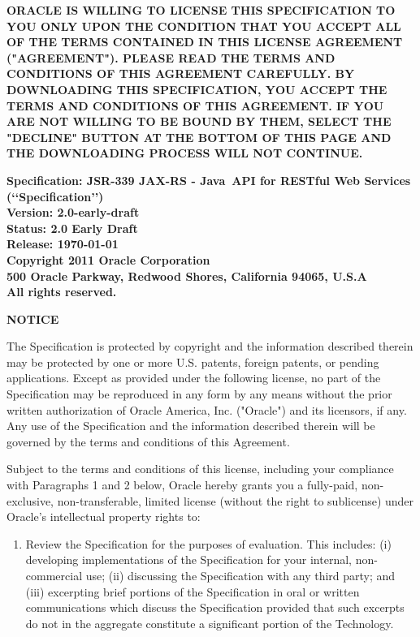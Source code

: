 \begin{flushleft}

{\bfseries ORACLE IS WILLING TO LICENSE THIS SPECIFICATION TO YOU ONLY UPON THE CONDITION THAT YOU ACCEPT ALL OF THE TERMS CONTAINED IN THIS LICENSE AGREEMENT ("AGREEMENT"). PLEASE READ THE TERMS AND CONDITIONS OF THIS AGREEMENT CAREFULLY. BY DOWNLOADING THIS SPECIFICATION, YOU ACCEPT THE TERMS AND CONDITIONS OF THIS AGREEMENT. IF YOU ARE NOT WILLING TO BE BOUND BY THEM, SELECT THE "DECLINE" BUTTON AT THE BOTTOM OF THIS PAGE AND THE DOWNLOADING PROCESS WILL NOT CONTINUE.}

{\bfseries Specification: JSR-339 JAX-RS - Java\texttrademark\ API for RESTful Web Services (\lq\lq Specification\rq\rq)\\
Version: 2.0-early-draft\\
Status: 2.0 Early Draft\\
Release: \today\\ 
Copyright 2011 Oracle Corporation\\
500 Oracle Parkway, Redwood Shores, California 94065, U.S.A\\ 
All rights reserved.
}

{\bfseries NOTICE}

The Specification is protected by copyright and the information described therein may be protected by one or more U.S. patents, foreign patents, or pending applications. Except as provided under the following license, no part of the Specification may be reproduced in any form by any means without the prior written authorization of Oracle America, Inc. ("Oracle") and its licensors, if any. Any use of the Specification and the information described therein will be governed by the terms and conditions of this Agreement. 

Subject to the terms and conditions of this license, including your compliance with Paragraphs 1 and 2 below, Oracle hereby grants you a fully-paid, non-exclusive, non-transferable, limited license (without the right to sublicense) under Oracle's intellectual property rights to:

\begin{enumerate}
\item Review the Specification for the purposes of evaluation. This includes: (i) developing implementations of the Specification for your internal, non-commercial use; (ii) discussing the Specification with any third party; and (iii) excerpting brief portions of the Specification in oral or written communications which discuss the Specification provided that such excerpts do not in the aggregate constitute a significant portion of the Technology.


\end{enumerate}
\end{flushleft}
